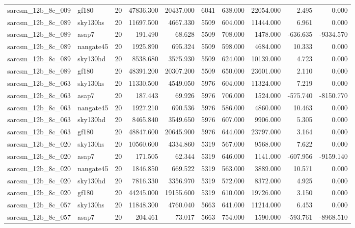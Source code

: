 \begin{tabular}{llrrrrrrrr}
sarcsm\_12b\_8c\_009 & gf180 & 20 & 47836.300 & 20437.000 & 6041 & 638.000 & 22054.000 & 2.495 & 0.000 \\
sarcsm\_12b\_8c\_089 & sky130hs & 20 & 11697.500 & 4667.330 & 5509 & 604.000 & 11444.000 & 6.961 & 0.000 \\
sarcsm\_12b\_8c\_089 & asap7 & 20 & 191.490 & 68.628 & 5509 & 708.000 & 1478.000 & -636.635 & -9334.570 \\
sarcsm\_12b\_8c\_089 & nangate45 & 20 & 1925.890 & 695.324 & 5509 & 598.000 & 4684.000 & 10.333 & 0.000 \\
sarcsm\_12b\_8c\_089 & sky130hd & 20 & 8538.680 & 3575.930 & 5509 & 624.000 & 10139.000 & 4.723 & 0.000 \\
sarcsm\_12b\_8c\_089 & gf180 & 20 & 48391.200 & 20307.200 & 5509 & 650.000 & 23601.000 & 2.110 & 0.000 \\
sarcsm\_12b\_8c\_063 & sky130hs & 20 & 11330.500 & 4549.050 & 5976 & 604.000 & 11324.000 & 7.219 & 0.000 \\
sarcsm\_12b\_8c\_063 & asap7 & 20 & 187.443 & 69.926 & 5976 & 706.000 & 1524.000 & -575.740 & -8150.770 \\
sarcsm\_12b\_8c\_063 & nangate45 & 20 & 1927.210 & 690.536 & 5976 & 586.000 & 4860.000 & 10.463 & 0.000 \\
sarcsm\_12b\_8c\_063 & sky130hd & 20 & 8465.840 & 3549.650 & 5976 & 607.000 & 9906.000 & 5.305 & 0.000 \\
sarcsm\_12b\_8c\_063 & gf180 & 20 & 48847.600 & 20645.900 & 5976 & 644.000 & 23797.000 & 3.164 & 0.000 \\
sarcsm\_12b\_8c\_020 & sky130hs & 20 & 10560.600 & 4334.860 & 5319 & 567.000 & 9568.000 & 7.622 & 0.000 \\
sarcsm\_12b\_8c\_020 & asap7 & 20 & 171.505 & 62.344 & 5319 & 646.000 & 1141.000 & -607.956 & -9159.140 \\
sarcsm\_12b\_8c\_020 & nangate45 & 20 & 1846.850 & 669.522 & 5319 & 563.000 & 3889.000 & 10.571 & 0.000 \\
sarcsm\_12b\_8c\_020 & sky130hd & 20 & 7816.330 & 3356.970 & 5319 & 572.000 & 8372.000 & 4.925 & 0.000 \\
sarcsm\_12b\_8c\_020 & gf180 & 20 & 44245.000 & 19155.600 & 5319 & 610.000 & 19726.000 & 3.150 & 0.000 \\
sarcsm\_12b\_8c\_057 & sky130hs & 20 & 11848.300 & 4760.040 & 5663 & 641.000 & 11214.000 & 6.453 & 0.000 \\
sarcsm\_12b\_8c\_057 & asap7 & 20 & 204.461 & 73.017 & 5663 & 754.000 & 1590.000 & -593.761 & -8968.510 \\

\end{tabular}
